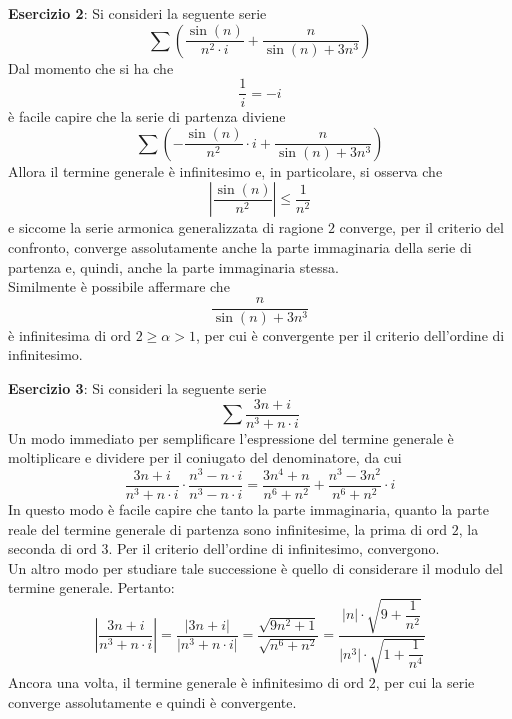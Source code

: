 \documentclass[a4paper]{extarticle}
\begin{document}
\vspace{1em}
\noindent
\textbf{Esercizio 2}: Si consideri la seguente serie
\[\sum \left(\frac{\sin(n)}{n^2 \cdot i} + \frac{n}{\sin(n)+3n^3}\right)\]
Dal momento che si ha che
\[\frac{1}{i}=-i\]
è facile capire che la serie di partenza diviene
\[\sum \left(-\frac{\sin(n)}{n^2}\cdot i + \frac{n}{\sin(n)+3n^3}\right)\]
Allora il termine generale è infinitesimo e, in particolare, si osserva che
\[\left \vert \frac{\sin(n)}{n^2} \right \vert \leq \frac{1}{n^2}\]
e siccome la serie armonica generalizzata di ragione $2$ converge, per il criterio del confronto, converge assolutamente anche la parte immaginaria della serie di partenza e, quindi, anche la parte immaginaria stessa.\\
Similmente è possibile affermare che
\[\frac{n}{\sin(n)+3n^3}\]
è infinitesima di ord $2 \geq \alpha > 1$, per cui è convergente per il criterio dell'ordine di infinitesimo.

\vspace{1em}
\noindent
\textbf{Esercizio 3}: Si consideri la seguente serie
\[\sum \frac{3n+i}{n^3+n\cdot i}\]
Un modo immediato per semplificare l'espressione del termine generale è moltiplicare e dividere per il coniugato del denominatore, da cui
\[\frac{3n+i}{n^3+n\cdot i} \cdot \frac{n^3 - n \cdot i}{n^3 - n \cdot i} = \frac{3n^4 + n}{n^6+n^2} + \frac{n^3 - 3n^2}{n^6+n^2} \cdot i\]
In questo modo è facile capire che tanto la parte immaginaria, quanto la parte reale del termine generale di partenza sono infinitesime, la prima di ord $2$, la seconda di ord $3$. Per il criterio dell'ordine di infinitesimo, convergono.\\
Un altro modo per studiare tale successione è quello di considerare il modulo del termine generale. Pertanto:
\[\left \vert \frac{3n+i}{n^3+n\cdot i} \right \vert = \frac{ \vert 3n+i \vert}{\vert n^3+n\cdot i \vert} = \frac{\sqrt{9n^2 + 1}}{\sqrt{n^6 +n^2}} = \dfrac{\left \vert n \right \vert \cdot \sqrt{9 + \dfrac{1}{n^2}}}{\vert n^3 \vert \cdot \sqrt{1 + \dfrac{1}{n^4}}}\]
Ancora una volta, il termine generale è infinitesimo di ord $2$, per cui la serie converge assolutamente e quindi è convergente.
\end{document}
